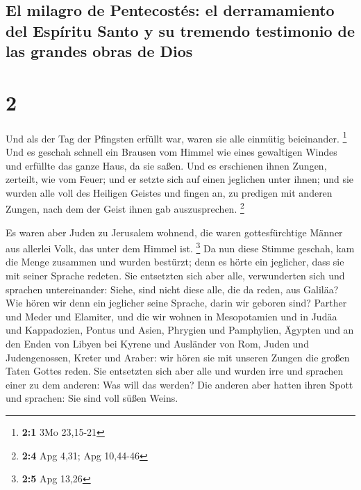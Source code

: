 \hypertarget{el-milagro-de-pentecostuxe9s-el-derramamiento-del-espuxedritu-santo-y-su-tremendo-testimonio-de-las-grandes-obras-de-dios}{%
\subsection{El milagro de Pentecostés: el derramamiento del Espíritu
Santo y su tremendo testimonio de las grandes obras de
Dios}\label{el-milagro-de-pentecostuxe9s-el-derramamiento-del-espuxedritu-santo-y-su-tremendo-testimonio-de-las-grandes-obras-de-dios}}

\hypertarget{section-1}{%
\section{2}\label{section-1}}

 Und als der Tag der Pfingsten erfüllt war, waren sie alle
einmütig beieinander. \footnote{\textbf{2:1} 3Mo 23,15-21}
 Und es geschah schnell ein Brausen vom Himmel wie eines
gewaltigen Windes und erfüllte das ganze Haus, da sie saßen.
 Und es erschienen ihnen Zungen, zerteilt, wie vom Feuer;
und er setzte sich auf einen jeglichen unter ihnen;  und
sie wurden alle voll des Heiligen Geistes und fingen an, zu predigen mit
anderen Zungen, nach dem der Geist ihnen gab auszusprechen. \footnote{\textbf{2:4}
  Apg 4,31; Apg 10,44-46}

 Es waren aber Juden zu Jerusalem wohnend, die waren
gottesfürchtige Männer aus allerlei Volk, das unter dem Himmel ist.
\footnote{\textbf{2:5} Apg 13,26}  Da nun diese Stimme
geschah, kam die Menge zusammen und wurden bestürzt; denn es hörte ein
jeglicher, dass sie mit seiner Sprache redeten.  Sie
entsetzten sich aber alle, verwunderten sich und sprachen untereinander:
Siehe, sind nicht diese alle, die da reden, aus Galiläa? 
Wie hören wir denn ein jeglicher seine Sprache, darin wir geboren sind?
 Parther und Meder und Elamiter, und die wir wohnen in
Mesopotamien und in Judäa und Kappadozien, Pontus und Asien,
 Phrygien und Pamphylien, Ägypten und an den Enden von
Libyen bei Kyrene und Ausländer von Rom,  Juden und
Judengenossen, Kreter und Araber: wir hören sie mit unseren Zungen die
großen Taten Gottes reden.  Sie entsetzten sich aber alle
und wurden irre und sprachen einer zu dem anderen: Was will das werden?
 Die anderen aber hatten ihren Spott und sprachen: Sie
sind voll süßen Weins.

